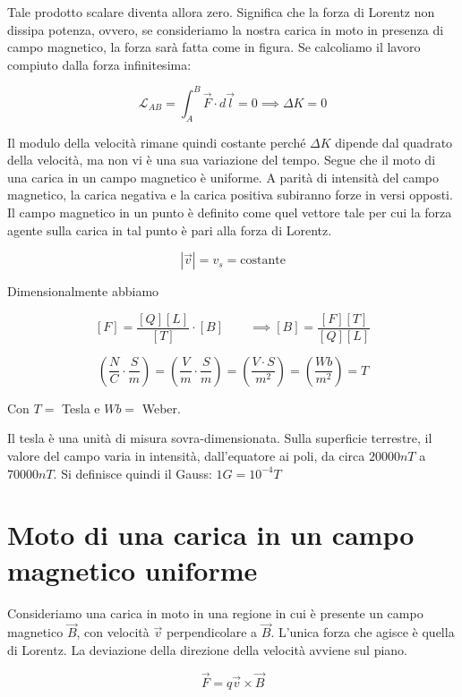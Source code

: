 Tale prodotto scalare diventa allora zero. Significa che la forza di Lorentz non dissipa potenza, ovvero, se consideriamo la nostra carica in moto in presenza di campo magnetico, la forza sarà fatta come in figura.
Se calcoliamo il lavoro compiuto dalla forza infinitesima:

\[
	\mathcal{L}_{AB}=\int_A^B \vec{F} \cdot d\vec{l} =0 \implies \Delta K=0
\]

Il modulo della velocità rimane quindi costante perché $\Delta K$ dipende dal quadrato della velocità, ma non vi è una sua variazione del tempo. Segue che il moto di una carica in un campo magnetico è uniforme. A parità di intensità del campo magnetico, la carica negativa e la carica positiva subiranno forze in versi opposti. Il campo magnetico in un punto è definito come quel vettore tale per cui la forza agente sulla carica in tal punto è pari alla forza di Lorentz.

\[
	|\vec{v} |=v_s = \text{costante}
\]

Dimensionalmente abbiamo

\[
	[F]=\frac{[Q][L]}{[T]}\cdot [B] \qquad \implies [B]=\frac{[F][T]}{[Q][L]}
\]

\[
	\left( \frac{N}{C}\cdot \frac{S}{m} \right) =\left( \frac{V}{m}\cdot \frac{S}{m} \right) = \left( \frac{V\cdot S}{m^2} \right) = \left( \frac{Wb}{m^2}\right)=T
\]

Con $ T =$ Tesla e $ Wb= $ Weber.

Il tesla è una unità di misura sovra-dimensionata. Sulla superficie terrestre, il valore del campo varia in intensità, dall'equatore ai poli, da circa $ 20000 nT $ a $ 70000 nT $.
Si definisce quindi il Gauss: $ 1 G = 10^{-4} T $

\section{Moto di una carica in un campo magnetico uniforme}

Consideriamo una carica in moto in una regione in cui è presente un campo magnetico $\vec{B}$, con velocità $\vec{v}$ perpendicolare a $ \vec{B}$. L'unica forza che agisce è quella di Lorentz. La deviazione della direzione della velocità avviene sul piano.

\[
	\vec{F} = q\vec{v} \times \vec{B}
\]

